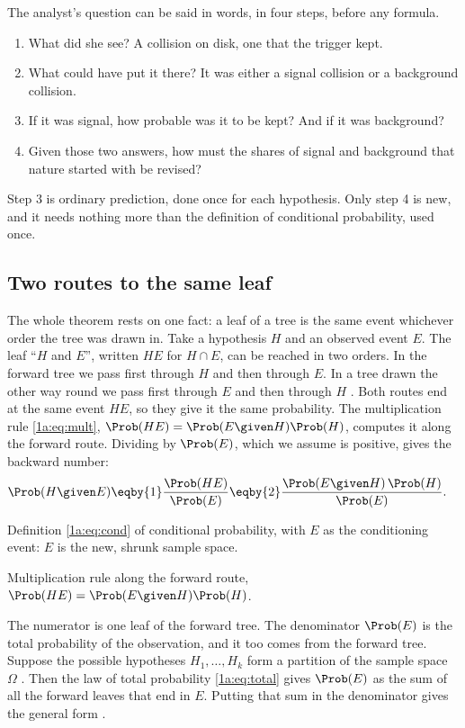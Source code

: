 The analyst's question can be said in words, in four steps, before any formula.
\begin{enumerate}[leftmargin=2em,itemsep=1pt]
  \item What did she see? A collision on disk, one that the trigger kept.
  \item What could have put it there? It was either a signal collision or a
        background collision.
  \item If it was signal, how probable was it to be kept? And if it was
        background?
  \item Given those two answers, how must the shares of signal and
        background that nature started with be revised?
\end{enumerate}
Step 3 is ordinary prediction, done once for each hypothesis. Only step 4 is
new, and it needs nothing more than the definition of conditional probability,
used once.

\subsection{Two routes to the same leaf}

The whole theorem rests on one fact: a leaf of a tree is the same event
whichever order the tree was drawn in. Take a hypothesis $H$ and an observed
event $E$. The leaf ``$H$ and $E$'', written $HE$ for $H\cap E$, can be reached
in two orders. In the forward tree we pass first through $H$ and then through
$E$. In a tree drawn the other way round we pass first through $E$ and then
through $H$ . Both routes end at the same event $HE$, so
they give it the same probability. The multiplication rule \eqref{1a:eq:mult},
$\Prob(HE)=\Prob(E\given H)\Prob(H)$, computes it along the forward route. Dividing
by $\Prob(E)$, which we assume is positive, gives the backward number:
\begin{align}
\Prob(H\given E)
&\eqby{1}\frac{\Prob(HE)}{\Prob(E)}
 \eqby{2}\frac{\Prob(E\given H)\,\Prob(H)}{\Prob(E)} .
\label{1a:eq:bayes-simple}
\end{align}
\begin{explain}
  \item Definition \eqref{1a:eq:cond} of conditional probability, with $E$ as
        the conditioning event: $E$ is the new, shrunk sample space.
  \item Multiplication rule along the forward route,
        $\Prob(HE)=\Prob(E\given H)\Prob(H)$.
\end{explain}
The numerator is one leaf of the forward tree. The denominator $\Prob(E)$ is the
total probability of the observation, and it too comes from the forward tree.
Suppose the possible hypotheses $H_1,\dots,H_k$ form a partition of the sample
space $\Omega$ . Then the law of total
probability \eqref{1a:eq:total} gives $\Prob(E)$ as the sum of all the forward
leaves that end in $E$. Putting that sum in the denominator gives the general
form .

